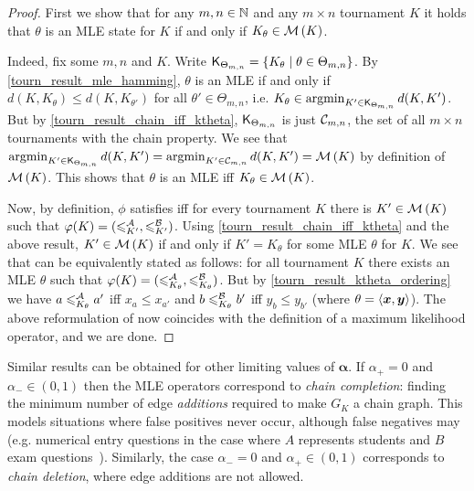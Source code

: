 \begin{proof}
    First we show that for any $m, n \in \mathbb{N}$ and any $m \times n$ tournament
    $K$ it holds that $\theta$ is an MLE state for $K$ if and only if $K_\theta
    \in \operatorname{\mathcal{M}}\left({K}\right)$.

    Indeed, fix some $m, n$ and $K$. Write $\mathsf{K}_{\Theta_{m,n}} = \{K_\theta \mid
    \theta \in \Theta_{m,n}\}$. By \cref{tourn_result_mle_hamming}, $\theta$ is an MLE
    if and only if $d(K, K_\theta) \le d(K, K_{\theta'})$ for all $\theta' \in
    \Theta_{m,n}$, i.e. $K_\theta \in \operatorname{argmin}_{K' \in \mathsf{K}_{\Theta_{m,n}}}{d(K,
    K')}$. But by \cref{tourn_result_chain_iff_ktheta}, $\mathsf{K}_{\Theta_{m,n}}$ is just
    $\mathcal{C}_{m,n}$, the set of all $m \times n$ tournaments with the chain
    property. We see that $\operatorname{argmin}_{K' \in \mathsf{K}_{\Theta_{m,n}}}{d(K, K')} =
    \operatorname{argmin}_{K' \in \mathcal{C}_{m,n}}{d(K, K')} = \operatorname{\mathcal{M}}\left({K}\right)$ by definition of
    $\operatorname{\mathcal{M}}\left({K}\right)$. This shows that $\theta$ is an MLE iff $K_\theta \in
    \operatorname{\mathcal{M}}\left({K}\right)$.

    Now, by definition, $\phi$ satisfies \chainmin{} iff for every
    tournament $K$ there is $K' \in \operatorname{\mathcal{M}}\left({K}\right)$ such that $\varphi(K) =
    ({\leqslant^{\mathcal{A}}_{K'}}, {\leqslant^{\mathcal{B}}_{K'}})$. Using \cref{tourn_result_chain_iff_ktheta} and the
    above result, $K' \in \operatorname{\mathcal{M}}\left({K}\right)$ if and only if $K' = K_\theta$ for some
    MLE $\theta$ for $K$. We see that \chainmin{} can be equivalently
    stated as follows: for all tournament $K$ there exists an MLE $\theta$ such
    that $\varphi(K) = ({\leqslant^{\mathcal{A}}_{K_\theta}}, {\leqslant^{\mathcal{B}}_{K_\theta}})$. But by
    \cref{tourn_result_ktheta_ordering} we have $a \leqslant^{\mathcal{A}}_{K_\theta} a'$ iff $x_a \le
    x_{a'}$ and $b \leqslant^{\mathcal{B}}_{K_\theta} b'$ iff $y_b \le y_{b'}$ (where $\theta =
    \langle {\bm{x}, \bm{y}} \rangle$). The above reformulation of \chainmin{}
    now coincides with the definition of a maximum likelihood operator, and we
    are done.
\end{proof}

Similar results can be obtained for
other limiting values of $\bm{\alpha}$. If $\alpha_+ = 0$ and $\alpha_- \in (0,
1)$ then the MLE operators correspond to \emph{chain completion}: finding
the minimum number of edge \emph{additions} required to make $G_K$ a chain graph. This
models situations where false positives never occur, although false negatives
may (e.g. numerical entry questions in the case where $A$ represents students
and $B$ exam questions~\cite{jiao2017algorithms}). Similarly, the case
$\alpha_- = 0$ and $\alpha_+ \in (0, 1)$ corresponds to \emph{chain deletion},
where edge additions are not allowed.


